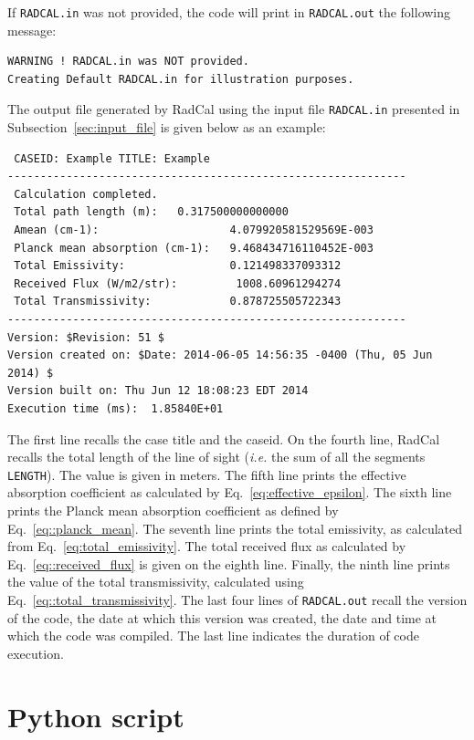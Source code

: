 If \verb=RADCAL.in= was not provided, the code will print in \verb=RADCAL.out= the following message:
\begin{lstlisting}
WARNING ! RADCAL.in was NOT provided.
Creating Default RADCAL.in for illustration purposes.
\end{lstlisting}

The output file generated by RadCal using the input file \verb=RADCAL.in= presented in Subsection~\ref{sec:input_file} is given below as an example:
\begin{lstlisting}
 CASEID: Example TITLE: Example
-------------------------------------------------------------
 Calculation completed.
 Total path length (m):   0.317500000000000
 Amean (cm-1):                    4.079920581529569E-003
 Planck mean absorption (cm-1):   9.468434716110452E-003
 Total Emissivity:                0.121498337093312
 Received Flux (W/m2/str):         1008.60961294274
 Total Transmissivity:            0.878725505722343
-------------------------------------------------------------
Version: $Revision: 51 $
Version created on: $Date: 2014-06-05 14:56:35 -0400 (Thu, 05 Jun 2014) $
Version built on: Thu Jun 12 18:08:23 EDT 2014
Execution time (ms):  1.85840E+01
\end{lstlisting}
The first line recalls the case title and the caseid. On the fourth line, RadCal recalls the total length of the line of sight (\textit{i.e.} the sum of all the segments \verb=LENGTH=). The value is given in meters. The fifth line prints the effective absorption coefficient as calculated by Eq.~\ref{eq:effective_epsilon}. The sixth line prints the Planck mean absorption coefficient as defined by Eq.~\ref{eq::planck_mean}. The seventh line prints the total emissivity, as calculated from Eq.~\ref{eq:total_emissivity}. The total received flux as calculated by Eq.~\ref{eq::received_flux} is given on the eighth line. Finally, the ninth line prints the value of the total transmissivity, calculated using Eq.~\ref{eq::total_transmissivity}.
The last four lines of \verb=RADCAL.out= recall the version of the code, the date at which this version was created, the date and time at which the code was compiled. The last line indicates the duration of code execution.

\section{Python script}

